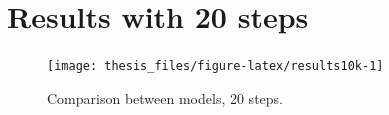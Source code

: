 \documentclass[12pt,twoside]{reedthesis}
\theoremstyle{definition}
\theoremstyle{definition}
\theoremstyle{remark}
\begin{document}
\begin{Shaded}
\begin{Highlighting}[]
      \OperatorTok{>=}\StringTok{ }\NormalTok{)\{}
  \StringTok{ }\OperatorTok{+}\StringTok{ }\OperatorTok{*}\StringTok{ }\OperatorTok{-}\StringTok{ }\OperatorTok{-}\StringTok{ }\NormalTok{(}\OperatorTok{/}\NormalTok{) }\OperatorTok{*}\StringTok{ }\OperatorTok{+}\StringTok{ }\OperatorTok{*}\StringTok{ }
  \StringTok{ }\NormalTok{((} \OperatorTok{-}\StringTok{ }\OperatorTok{^}\NormalTok{)) }\OperatorTok{*}\StringTok{ }
  \StringTok{ }\OperatorTok{+}\StringTok{ }\OperatorTok{*}\StringTok{ }\NormalTok{(}\NormalTok{))}
  \StringTok{ }
  \StringTok{ }
  \NormalTok{    \} }\NormalTok{ \{}
  \StringTok{ }
  \StringTok{ }\NormalTok{)\}}
  
  \StringTok{ }\OperatorTok{-}\StringTok{ }
  \NormalTok{    Result[Result }\OperatorTok{<=}\StringTok{ }\NormalTok{] =}\StringTok{ }
  \StringTok{ }\NormalTok{(}\OperatorTok{-}\OperatorTok{*}\OperatorTok{*}
  \StringTok{ }\NormalTok{(}\NormalTok{ =}\StringTok{ }\NormalTok{ =}\StringTok{ }\NormalTok{ =}\StringTok{ }
  \NormalTok{\}}
  \end{Highlighting}
  \end{Shaded}
  \section{Results with 20 steps}\label{resultsapp}
  \begin{figure}
  
  {\centering \texttt{[image: thesis\_files/figure-latex/results10k-1]} 
  
  }
  
  \caption{Comparison between models, 20 steps. \label{results10k}}\label{fig:results10k}
  \end{figure}
  \normalsize
  
\end{document}
